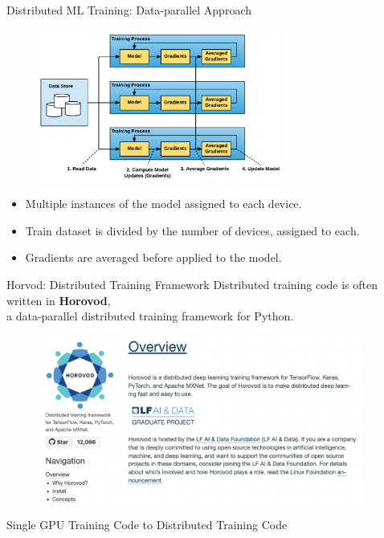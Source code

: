 \documentclass{beamer}
\begin{document}
\begin{frame}{Distributed ML Training: Data-parallel Approach}
  \begin{figure}
    \includegraphics[height=50mm]{data-parallel}
  \end{figure}
  {\footnotesize
  \begin{itemize}
    \item Multiple instances of the model assigned to each device.
    \item Train dataset is divided by the number of devices, assigned to each.
    \item Gradients are averaged before applied to the model.
  \end{itemize} 
  }
\end{frame}

\begin{frame}[fragile]{Horvod: Distributed Training Framework}
  Distributed training code is often written in \textbf{Horovod},\\
  a data-parallel distributed training framework for Python. 
  \begin{figure}[!h]
    \includegraphics[height=55mm]{horovod_logo}
  \end{figure}
\end{frame}


\begin{frame}{Single GPU Training Code to Distributed Training Code}
  \begin{columns}[t]
    \begin{column}{.5\textwidth}
      {\tiny
        \inputminted{Python}{tensorflow_ex.py}
      }
    \end{column}
    \begin{column}{.5\textwidth}
      {\tiny
        \inputminted{Python}{horovod_ex.py}
      }
    \end{column}
  \end{columns}
  
\end{frame}
\end{document}
